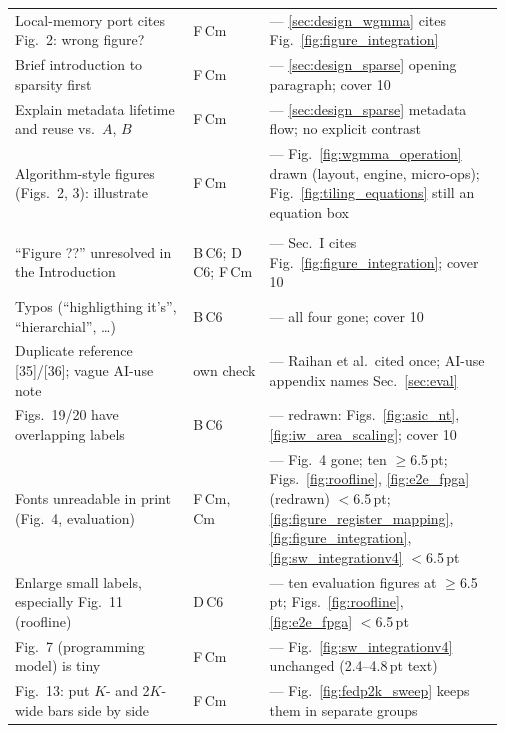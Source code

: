 \begin{longtable}{@{}p{0.355\linewidth} p{0.155\linewidth} p{0.46\linewidth}@{}}
Local-memory port cites Fig.~2: wrong figure? & F\,Cm & \stR{} --- \ref{sec:design_wgmma} cites Fig.~\ref{fig:figure_integration} \\
Brief introduction to sparsity first & F\,Cm & \stR{} --- \ref{sec:design_sparse} opening paragraph; cover 10 \\
Explain metadata lifetime and reuse vs.\ $A$, $B$ & F\,Cm & \stP{} --- \ref{sec:design_sparse} metadata flow; no explicit contrast \\
Algorithm-style figures (Figs.~2, 3): illustrate & F\,Cm & \stP{} --- Fig.~\ref{fig:wgmma_operation} drawn (layout, engine, micro-ops); Fig.~\ref{fig:tiling_equations} still an equation box \\
\rowcolor{gray!18}\multicolumn{3}{@{}l@{}}{\textbf{Figures, fonts and typos}} \\
``Figure ??'' unresolved in the Introduction & B\,C6; D\,C6; F\,Cm & \stR{} --- Sec.~I cites Fig.~\ref{fig:figure_integration}; cover 10 \\
Typos (``highligthing it's'', ``hierarchial'', \ldots) & B\,C6 & \stR{} --- all four gone; cover 10 \\
Duplicate reference [35]/[36]; vague AI-use note & own check & \stR{} --- Raihan et al.\ cited once; AI-use appendix names Sec.~\ref{sec:eval} \\
Figs.~19/20 have overlapping labels & B\,C6 & \stR{} --- redrawn: Figs.~\ref{fig:asic_nt}, \ref{fig:iw_area_scaling}; cover 10 \\
Fonts unreadable in print (Fig.~4, evaluation) & F\,Cm, Cm & \stP{} --- Fig.~4 gone; ten $\geq$6.5\,pt; Figs.~\ref{fig:roofline}, \ref{fig:e2e_fpga} (redrawn) $<$6.5\,pt; \ref{fig:figure_register_mapping}, \ref{fig:figure_integration}, \ref{fig:sw_integrationv4} $<$6.5\,pt \\
Enlarge small labels, especially Fig.~11 (roofline) & D\,C6 & \stP{} --- ten evaluation figures at $\geq$6.5\,pt; Figs.~\ref{fig:roofline}, \ref{fig:e2e_fpga} $<$6.5\,pt \\
Fig.~7 (programming model) is tiny & F\,Cm & \stO{} --- Fig.~\ref{fig:sw_integrationv4} unchanged (2.4--4.8\,pt text) \\
Fig.~13: put $K$- and 2$K$-wide bars side by side & F\,Cm & \stO{} --- Fig.~\ref{fig:fedp2k_sweep} keeps them in separate groups \\
\bottomrule
\end{longtable}
\endgroup
\setcounter{table}{\value{trkTable}}
\clearpage
\twocolumn
